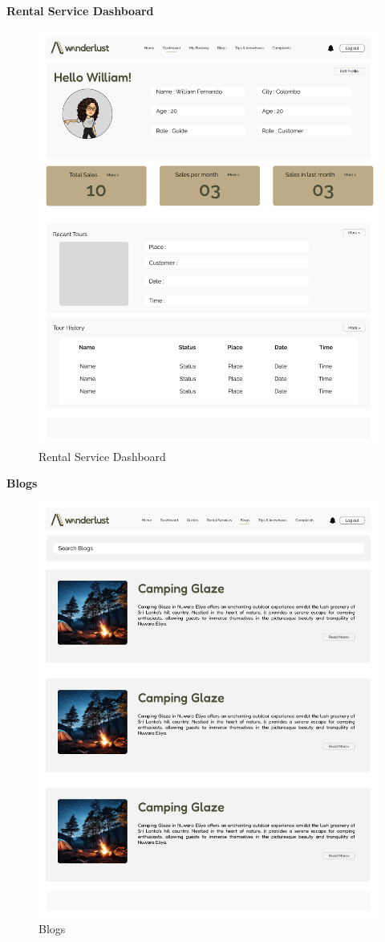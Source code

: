 \textbf{Rental Service Dashboard}\\
\begin{figure}[h!]
    \centering
    \includegraphics[width=1\textwidth]{Images/Wireframes/Rental Dashboard.png}
    \caption{Rental Service Dashboard}
\end{figure}
\clearpage

\textbf{Blogs}\\
\begin{figure}[h!]
    \centering
    \includegraphics[width=1\textwidth]{Images/Wireframes/Blogs for srs.png}
    \caption{Blogs}
\end{figure}
\clearpage

